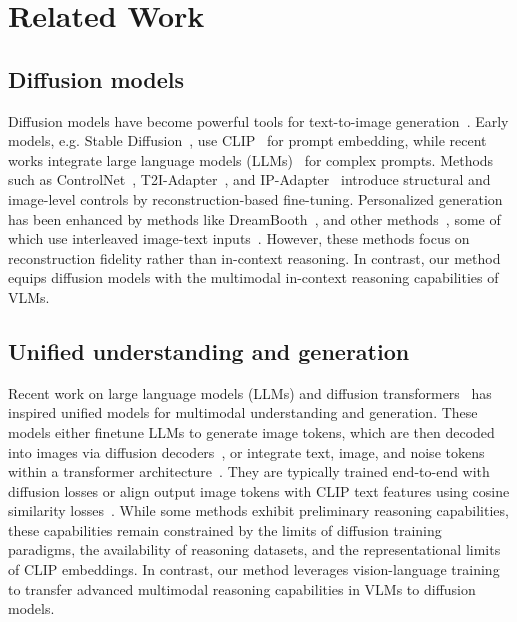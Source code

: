 \section{Related Work}
\subsection{Diffusion models}

Diffusion models have become powerful tools for text-to-image generation~\cite{ho2020denoising, rombach2022high, flux_github}. Early models, e.g. Stable Diffusion~\cite{rombach2022high}, use CLIP~\cite{radford2021learning} for prompt embedding, while recent works integrate large language models (LLMs)~\cite{saharia2022photorealistic, chenpixart, sd3_5_github} for complex prompts. Methods such as ControlNet~\cite{zhang2023adding}, T2I-Adapter~\cite{mou2024t2i}, and IP-Adapter~\cite{ye2023ip} introduce structural and image-level controls by reconstruction-based fine-tuning. Personalized generation has been enhanced by methods like DreamBooth~\cite{ruiz2023dreambooth}, and other methods~\cite{galimage, wang2024moa, li2024photomaker, wang2024instantid, qian2024omniid, wang2024visual}, some of which use interleaved image-text inputs~\cite{pan2023kosmos, berman2024mumu}. However, these methods focus on reconstruction fidelity rather than in-context reasoning. In contrast, our method equips diffusion models with the multimodal in-context reasoning capabilities of VLMs.


\subsection{Unified understanding and generation}

Recent work on large language models (LLMs) and diffusion transformers~\cite{peebles2023scalable, flux_github} has inspired unified models for multimodal understanding and generation. These models either finetune LLMs to generate image tokens, which are then decoded into images via diffusion decoders~\cite{gemaking, pan2023kosmos, sun2023generative, koh2024generating, wu2023next, ye2024x}, or integrate text, image, and noise tokens within a transformer architecture~\cite{xiao2024omnigen, shi2024llamafusion}. They are typically trained end-to-end with diffusion losses or align output image tokens with CLIP text features using cosine similarity losses~\cite{wu2023next, ye2024x, tong2024metamorph}. While some methods exhibit preliminary reasoning capabilities, these capabilities remain constrained by the limits of diffusion training paradigms, the availability of reasoning datasets, and the representational limits of CLIP embeddings. In contrast, our method leverages vision-language training to transfer advanced multimodal reasoning capabilities in VLMs to diffusion models. 



